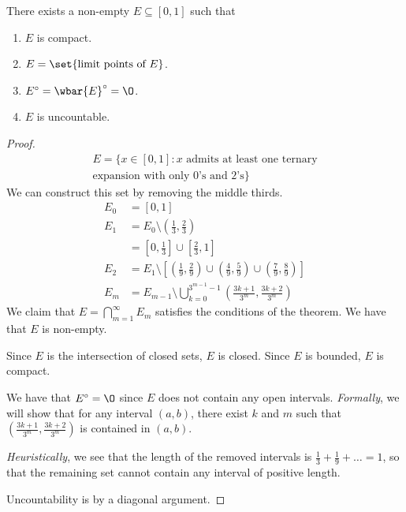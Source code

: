 \begin{theorem} \label{thm:cantor_set}
    There exists a non-empty $E \subseteq [0, 1]$ such that
    \begin{enumerate}
        \item $E$ is compact.
        \item $E = \set{\text{limit points of } E}$.
        \item $E^\circ = \wbar{E}^\circ = \O$.
        \item $E$ is uncountable.
    \end{enumerate}
\end{theorem}
\begin{proof}
    \begin{align*}
        E = \{x \in [0, 1] : x \text{ admits at least one ternary} \\
        \text{expansion with only $0$'s and $2$'s}\}
    \end{align*}
    We can construct this set by removing the middle thirds.
    \begin{align*}
        E_0 &= [0, 1] \\
        E_1 &= E_0 \setminus \left(\frac13, \frac23\right) \\
           &= \left[0, \frac13\right] \cup \left[\frac23, 1\right] \\
        E_2 &= E_1 \setminus \left[\left(\frac19, \frac29\right) \cup
            \left(\frac49, \frac59\right) \cup \left(\frac79, \frac89\right)\right] \\
        E_m &= E_{m-1} \setminus \bigcup_{k=0}^{3^{m-1} - 1}
            \left(\frac{3k + 1}{3^m}, \frac{3k + 2}{3^m}\right)
    \end{align*}
    We claim that $E = \bigcap_{m=1}^\infty E_m$ satisfies the conditions of
    the theorem.
    We have that $E$ is non-empty. %

    Since $E$ is the intersection of closed sets, $E$ is closed.
    Since $E$ is bounded, $E$ is compact.

    We have that $E^\circ = \O$ since $E$ does not contain any open
    intervals.
    \emph{Formally}, we will show that for any interval $(a, b)$, there
    exist $k$ and $m$ such that $\left(\frac{3k+1}{3^m}, \frac{3k+2}{3^m}
    \right)$ is contained in $(a, b)$. %

    \emph{Heuristically}, we see that the length of the removed intervals
    is $\frac13 + \frac19 + \dots = 1$, so that the remaining set cannot
    contain any interval of positive length.

    Uncountability is by a diagonal argument.
\end{proof}
